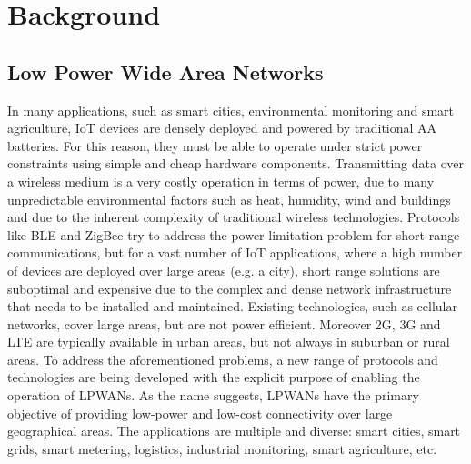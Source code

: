 
\chapter{Background}
\label{chapter:background}


\section{Low Power Wide Area Networks}

In many applications, such as smart cities, environmental monitoring and smart agriculture, \gls{IoT} devices are densely deployed and powered by traditional AA batteries. For this reason, they must be able to operate under strict power constraints using simple and cheap hardware components. Transmitting data over a wireless medium is a very costly operation in terms of power, due to many unpredictable environmental factors such as heat, humidity, wind and buildings and due to the inherent complexity of traditional wireless technologies.
Protocols like \gls{BLE} and ZigBee try to address the power limitation problem for short-range communications, but for a vast number of \gls{IoT} applications, where a high number of devices are deployed over large areas (e.g. a city), short range solutions are suboptimal and expensive due to the complex and dense network infrastructure that needs to be installed and maintained. Existing technologies, such as cellular networks, cover large areas, but are not power efficient. Moreover 2G, 3G and LTE are typically available in urban areas, but not always in suburban or rural areas. To address the aforementioned problems, a new range of protocols and technologies are being developed with the explicit purpose of enabling the operation of \glspl{LPWAN}. As the name suggests, \glspl{LPWAN} have the primary objective of providing low-power and low-cost connectivity over large geographical areas. The applications are multiple and diverse: smart cities, smart grids, smart metering, logistics, industrial monitoring, smart agriculture, etc.
